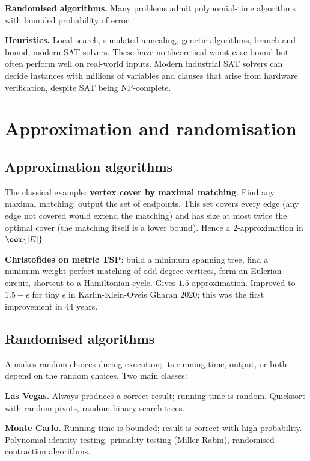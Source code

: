\textbf{Randomised algorithms.} Many problems admit polynomial-time algorithms with bounded probability of error.

\textbf{Heuristics.} Local search, simulated annealing, genetic algorithms, branch-and-bound, modern SAT solvers. These have no theoretical worst-case bound but often perform well on real-world inputs. Modern industrial SAT solvers can decide instances with millions of variables and clauses that arise from hardware verification, despite SAT being NP-complete.

\section{Approximation and randomisation}

\subsection{Approximation algorithms}

The classical example: \textbf{vertex cover by maximal matching}. Find any maximal matching; output the set of endpoints. This set covers every edge (any edge not covered would extend the matching) and has size at most twice the optimal cover (the matching itself is a lower bound). Hence a $2$-approximation in $\oom{|E|}$.

\textbf{Christofides on metric TSP}: build a minimum spanning tree, find a minimum-weight perfect matching of odd-degree vertices, form an Eulerian circuit, shortcut to a Hamiltonian cycle. Gives $1.5$-approximation. Improved to $1.5 - \epsilon$ for tiny $\epsilon$ in Karlin-Klein-Oveis Gharan 2020; this was the first improvement in $44$ years.

\subsection{Randomised algorithms}

A  makes random choices during execution; its running time, output, or both depend on the random choices. Two main classes:

\textbf{Las Vegas.} Always produces a correct result; running time is random. Quicksort with random pivots, random binary search trees.

\textbf{Monte Carlo.} Running time is bounded; result is correct with high probability. Polynomial identity testing, primality testing (Miller-Rabin), randomised contraction algorithms.

